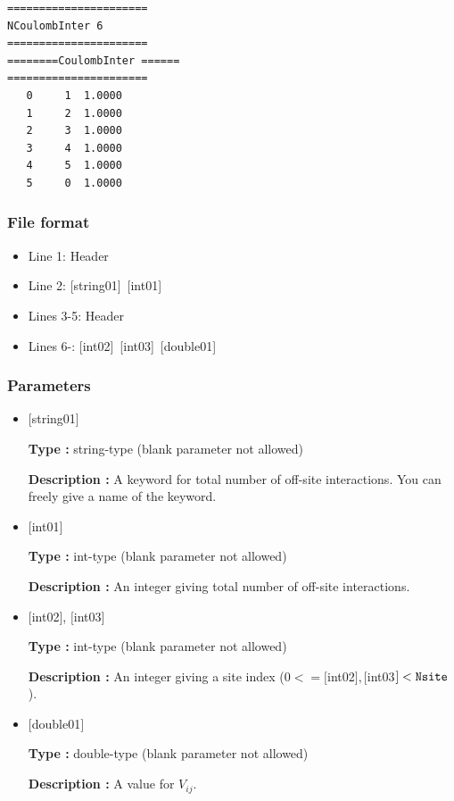 \begin{minipage}{12.5cm}
\begin{screen}
\begin{verbatim}
====================== 
NCoulombInter 6  
====================== 
========CoulombInter ====== 
====================== 
   0     1  1.0000
   1     2  1.0000
   2     3  1.0000
   3     4  1.0000
   4     5  1.0000
   5     0  1.0000
\end{verbatim}
\end{screen}
\end{minipage}

\subsubsection{File format}
 \begin{itemize}
   \item  Line 1:  Header
   \item  Line 2:   [string01]~[int01]
   \item  Lines 3-5:  Header
   \item  Lines 6-: 
   [int02]~[int03]~[double01] 
  \end{itemize}
\subsubsection{Parameters}
 \begin{itemize}

   \item  $[$string01$]$
   
    {\bf Type :} string-type (blank parameter not allowed)

   {\bf Description :} A keyword for total number of off-site interactions. You can freely give a name of the keyword.

   \item  $[$int01$]$
   
    {\bf Type :} int-type (blank parameter not allowed)

   {\bf Description :}  An integer giving total number of off-site interactions.

  \item  $[$int02$]$, $[$int03$]$
  
 {\bf Type :} int-type (blank parameter not allowed)

{\bf Description :} An integer giving a site index ($0<= [$int02$], [$int03$]<\verb|Nsite|$).
 
 \item  $[$double01$]$
   
   {\bf Type :} double-type (blank parameter not allowed)

  {\bf Description :}  A value for $V_{ij}$.
  
\end{itemize}

